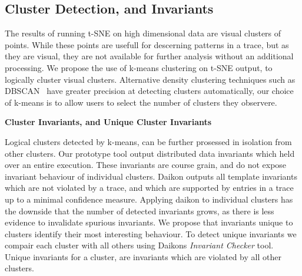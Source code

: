 \subsection{Cluster Detection, and Invariants}

The results of running t-SNE on high dimensional data are visual
clusters of points. While these points are usefull for descerning
patterns in a trace, but as they are visual, they are not available
for further analysis without an additional processing. We propose the
use of k-means clustering on t-SNE output, to logically cluster visual
clusters. Alternative density clustering techniques such as
DBSCAN~\cite{} have greater precision at detecting
clusters automatically, our choice of k-means is to allow users to
select the number of clusters they observere.

\textbf{Cluster Invariants, and Unique Cluster Invariants}

Logical clusters detected by k-means, can be further prosessed in
isolation from other clusters. Our prototype tool output distributed
data invariants which held over an entire execution. These invariants
are course grain, and do not expose invariant behaviour of individual
clusters.  
%
Daikon outputs all template invariants which are not violated by a
trace, and which are supported by entries in a trace up to a minimal
confidence measure. Applying daikon to individual clusters has the
downside that the number of detected invariants grows, as there is
less evidence to invalidate spurious invariants. We propose that
invariants unique to clusters identify their most interesting
behaviour. To detect unique invariants we compair each cluster with
all others using Daikons \emph{Invariant Checker} tool. Unique
invariants for a cluster, are invariants which are violated by all
other clusters.



